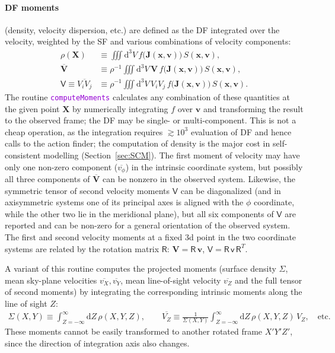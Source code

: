 \documentclass[12pt]{article}
\newcommand{\ttt}[1]{\textcolor{darkviolet}{\texttt{#1}}}
\renewcommand{\d}{\mathrm{d}}
\newcommand{\bv}{\boldsymbol{v}}
\newcommand{\bx}{\boldsymbol{x}}
\newcommand{\bX}{\boldsymbol{X}}
\newcommand{\bV}{\boldsymbol{V}}
\newcommand{\bJ}{\boldsymbol{J}}
\let\oldparagraph\paragraph
\renewcommand{\paragraph}[1]{\vspace{-2mm}\oldparagraph{#1}}
\begin{document}
\paragraph{DF moments} (density, velocity dispersion, etc.) are defined as the DF integrated over the velocity, weighted by the SF and various combinations of velocity components:
\begin{align*}
\rho(\bX) &\equiv \iiint \d ^3V\, f\big(\bJ(\bx,\bv)\big)\,S(\bx,\bv), \\
\overline{\bV} &\equiv \rho^{-1} \iiint \d ^3V \,\bV\, f\big(\bJ(\bx,\bv)\big)\,S(\bx,\bv), \\
\mathsf{V} \equiv \overline{V_i V_j} &\equiv \rho^{-1} \iiint \d ^3V \,V_i V_j\, f\big(\bJ(\bx,\bv)\big)\,S(\bx,\bv).
\end{align*}
The routine \ttt{computeMoments} calculates any combination of these quantities at the given point $\bX$ by numerically integrating $f$ over $\bv$ and transforming the result to the observed frame; the DF may be single- or multi-component. 
This is not a cheap operation, as the integration requires $\gtrsim 10^3$ evaluation of DF and hence calls to the action finder; the computation of density is the major cost in self-consistent modelling (Section~\ref{sec:SCM}). The first moment of velocity may have only one non-zero component ($\overline{v_\phi}$) in the intrinsic coordinate system, but possibly all three components of $\overline{\bV}$ can be nonzero in the observed system. Likewise, the symmetric tensor of second velocity moments $\mathsf{V}$ can be diagonalized (and in axisymmetric systems one of its principal axes is aligned with the $\phi$ coordinate, while the other two lie in the meridional plane), but all six components of $\mathsf{V}$ are reported and can be non-zero for a general orientation of the observed system. The first and second velocity moments at a fixed 3d point in the two coordinate systems are related by the rotation matrix $\mathsf{R}$: $\bV = \mathsf{R}\,\bv$, $\mathsf{V} = \mathsf{R}\,\mathsf{v}\,\mathsf{R}^T$.

A variant of this routine computes the projected moments (surface density $\Sigma$, mean sky-plane velocities $\overline{v_X}, \overline{v_Y}$, mean line-of-sight velocity $\overline{v_Z}$ and the full tensor of second moments) by integrating the corresponding intrinsic moments along the line of sight $Z$:
\begin{align*}
\Sigma(X,Y) \equiv \int_{Z=-\infty}^\infty \d Z\, \rho(X,Y,Z), \qquad
\overline{V_Z} \equiv \frac{1}{\Sigma(X,Y)} \int_{Z=-\infty}^\infty \d Z\, \rho(X,Y,Z)\, V_Z, \quad\mbox{etc.}
\end{align*}
These moments cannot be easily transformed to another rotated frame $X'Y'Z'$, since the direction of integration axis also changes.
\end{document}
